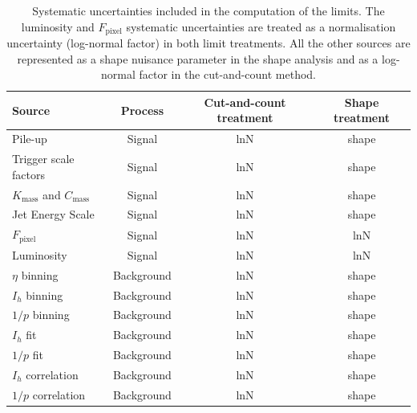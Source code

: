 \begin{table}[h!]
    \centering
    \footnotesize
    \renewcommand{\arraystretch}{1.4}
    \begin{tabular}{lccc}
        \toprule
        Source & Process & Cut-and-count treatment & Shape treatment \\
        \midrule
        Pile-up                & Signal       & lnN & shape \\
        Trigger scale factors & Signal       &  lnN & shape \\
        $K_\textrm{mass}$ and $C_\textrm{mass}$ & Signal       & lnN & shape \\
        Jet Energy Scale      & Signal       & lnN & shape \\
        $F_\textrm{pixel}$             & Signal       & lnN & lnN \\
        Luminosity            & Signal       & lnN & lnN \\
        \midrule
        $\eta$ binning        & Background   & lnN & shape \\
        $I_h$ binning         & Background   & lnN & shape \\
        $1/p$ binning           & Background   & lnN & shape \\
        $I_h$ fit             & Background   & lnN & shape \\
        $1/p$ fit             & Background   & lnN & shape \\
        $I_h$ correlation  & Background   & lnN & shape \\
        $1/p$ correlation  & Background   & lnN & shape \\
        \bottomrule
    \end{tabular}
    \caption{Systematic uncertainties included in the computation of the limits. The luminosity and $F_\textrm{pixel}$ systematic uncertainties are treated as a normalisation uncertainty (log-normal factor) in both limit treatments. All the other sources are represented as a shape nuisance parameter in the shape analysis and as a log-normal factor in the cut-and-count method.}
    \label{tab:limits:systs}
\end{table}




